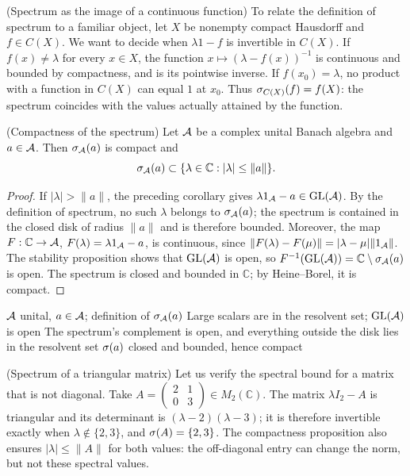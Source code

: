 \begin{cthejemplo}{(Spectrum as the image of a continuous function)}
To relate the definition of spectrum to a familiar object, let
$X$ be nonempty compact Hausdorff and $f\in C(X)$. We want to decide when
$\lambda1-f$ is invertible in $C(X)$. If
$f(x)\ne\lambda$ for every $x\in X$, the function
$x\mapsto(\lambda-f(x))^{-1}$ is continuous and bounded by compactness,
and is its pointwise inverse. If $f(x_0)=\lambda$, no product with a
function in $C(X)$ can equal $1$ at $x_0$. Thus
$\sigma_{C(X)}(f)=f(X)$: the spectrum coincides with the values
actually attained by the function.
\end{cthejemplo}

\pagebreak
\begin{cthproposicion}{(Compactness of the spectrum)}
Let $\mathcal A$ be a complex unital Banach algebra and $a\in\mathcal A$.
Then $\sigma_\mathcal A(a)$ is compact and
\[
 \sigma_\mathcal A(a)\subset\{\lambda\in\mathbb C:|\lambda|\le\|a\|\}.
\]
\end{cthproposicion}

\begin{proof}[Proof]
If $|\lambda|>\|a\|$, the preceding corollary gives
$\lambda1_\mathcal A-a\in\operatorname{GL}(\mathcal A)$. By the definition of spectrum, no
such $\lambda$ belongs to $\sigma_\mathcal A(a)$; the spectrum is contained in the
closed disk of radius $\|a\|$ and is therefore bounded.
Moreover, the map $F:\mathbb C\to\mathcal A$, $F(\lambda)=\lambda1_\mathcal A-a$,
is continuous, since
$\|F(\lambda)-F(\mu)\|=|\lambda-\mu|\|1_\mathcal A\|$.
The stability proposition shows that $\operatorname{GL}(\mathcal A)$ is open, so
$F^{-1}(\operatorname{GL}(\mathcal A))=\mathbb C\setminus\sigma_\mathcal A(a)$ is open.
The spectrum is closed and bounded in $\mathbb C$; by Heine--Borel, it is compact.
\end{proof}

\proofdiagram
{$\mathcal A$ unital, $a\in\mathcal A$; definition of $\sigma_\mathcal A(a)$}
{Large scalars are in the resolvent set; $\operatorname{GL}(\mathcal A)$ is open}
{The spectrum's complement is open, and everything outside the disk lies in the resolvent set}
{$\sigma(a)$ closed and bounded, hence compact}

\begin{cthejemplo}{(Spectrum of a triangular matrix)}
Let us verify the spectral bound for a matrix that is not diagonal.
Take $A=\begin{pmatrix}2&1\\0&3\end{pmatrix}\in M_2(\mathbb C)$.
The matrix $\lambda I_2-A$ is triangular and its determinant is
$(\lambda-2)(\lambda-3)$; it is therefore invertible exactly when
$\lambda\notin\{2,3\}$, and $\sigma(A)=\{2,3\}$.
The compactness proposition also ensures $|\lambda|\le\|A\|$
for both values: the off-diagonal entry can change the
norm, but not these spectral values.
\end{cthejemplo}

